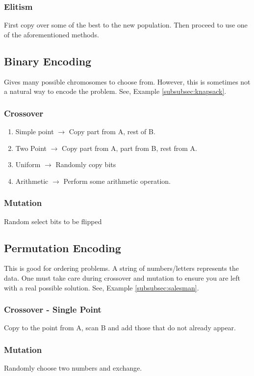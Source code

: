 \subsubsection{Elitism}
First copy over some of the best to the new population. Then proceed to use one 
of the aforementioned methods.

\subsection{Binary Encoding}
\label{subsec:binary}
Gives many possible chromosomes to choose from. However, this is sometimes not 
a natural way to encode the problem. See, Example \ref{subsubsec:knapsack}. 
\subsubsection{Crossover}
\begin{enumerate}
\item Simple point $\rightarrow$ Copy part from A, rest of B.
\item Two Point  $\rightarrow$ Copy part from A, part from B, rest from A.
\item Uniform  $\rightarrow$ Randomly copy bits
\item Arithmetic  $\rightarrow$ Perform some arithmetic operation.
\end{enumerate}
\subsubsection{Mutation}
Random select bits to be flipped

\subsection{Permutation Encoding}
This is good for ordering problems. A string of numbers/letters represents the 
data. One must take care during crossover and mutation to ensure you are left 
with a real possible solution. See, Example \ref{subsubsec:salesman}.
\subsubsection{Crossover - Single Point}
Copy to the point from A, scan B and add those that do not already appear. 
\subsubsection{Mutation}
Randomly choose two numbers and exchange.

